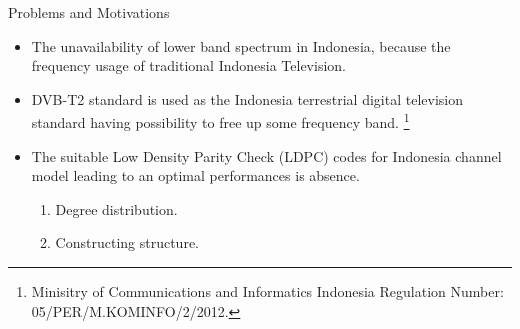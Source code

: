 \documentclass[11pt, aspectratio=169]{beamer}
\newcommand\blfootnote[1]{%
  \begingroup
  \renewcommand\thefootnote{}\footnote{#1}%
  \addtocounter{footnote}{-1}%
  \endgroup
}
\begin{document}
\begin{frame}{Problems and Motivations}
\begin{figure}
\begin{minipage}{.5\linewidth}
	\vspace{-0.5cm}
\end{minipage}
\hfill
\label{gambar: awgnhasil}
\end{figure}
\vspace{-35pt}
\begin{itemize}
	
	
	
	
	
\justifying
\item The unavailability of lower band spectrum in Indonesia, because the frequency usage of traditional Indonesia Television. 
\item DVB-T2 standard is used as the Indonesia terrestrial digital television standard having possibility to free up some frequency band.  \blfootnote{\tiny{Minisitry of Communications and Informatics Indonesia Regulation Number: 05/PER/M.KOMINFO/2/2012.}}
\item The suitable Low Density Parity Check (LDPC) codes for Indonesia channel model leading to an optimal performances is absence.
\begin{enumerate}
	\item Degree distribution.
	\item Constructing structure.
\end{enumerate}
\end{itemize}
\end{frame}
\end{document}
